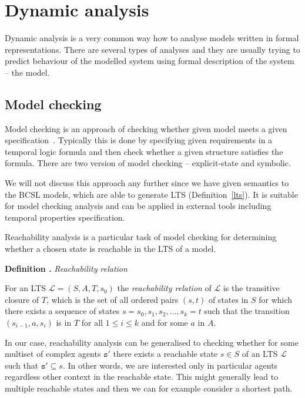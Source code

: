 \documentclass[12pt, twoside]{fithesis2} %
\newcounter{counter}[section]
\renewcommand{\thecounter}{\thesection.\arabic{counter}}
\newenvironment{definition}[1]{\bigskip\refstepcounter{counter}\noindent\textbf{Definition \thecounter } \emph{#1} \par\nopagebreak \begin{itshape}}{\end{itshape}\bigskip}
\begin{document}
\section{Dynamic analysis}

Dynamic analysis is a very common way how to analyse models written in formal representations. There are several types of analyses and they are usually trying to predict behaviour of the modelled system using formal description of the system -- the model.

\subsection{Model checking}

Model checking is an approach of checking whether given model meets a given specification~\cite{clarke1999model}. Typically this is done by specifying given requirements in a temporal logic formula and then check whether a given structure satisfies the formula. There are two version of model checking -- explicit-state and symbolic.

We will not discuss this approach any further since we have given semantics to the BCSL models, which are able to generate LTS (Definition~\ref{lts}). It is suitable for model checking analysis and can be applied in external tools including temporal properties specification.

Reachability analysis is a particular task of model checking for determining whether a chosen state is reachable in the LTS of a model.

\begin{definition}{Reachability relation}
\label{reachability_relation}
For an LTS $\mathcal{L} = (S, A, T, s_0)$ the \emph{reachability relation} of $\mathcal{L}$ is the transitive closure of $T$, which is the set of all ordered pairs $(s,t)$ of states in $S$ for which there exists a sequence of states $s = s_0, s_1, s_2, \ldots, s_k = t$ such that the transition $(s_{i-1}, a, s_i)$ is in $T$ for all $1 \leq i \leq k$ and for some $a$ in $A$.
\end{definition}

In our case, reachability analysis can be generalised to checking whether for some multiset of complex agents $\mathtt{s}'$ there exists a reachable state $s \in S$ of an LTS $\mathcal{L}$ such that $\mathtt{s}' \subseteq s$. In other words, we are interested only in particular agents regardless other context in the reachable state. This might generally lead to multiple reachable states and then we can for example consider a shortest path.
\end{document}
